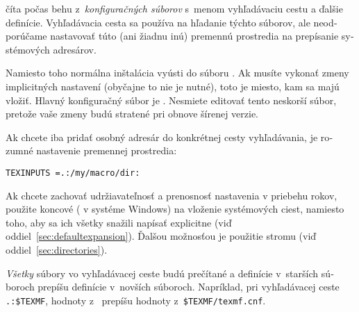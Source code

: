 \documentclass[\classoptions,slovak,english,czech]{\classname}
\begin{document}
\begin{otherlanguage}{slovak}
\KPS{} číta počas behu z~\emph{konfiguračných súborov}
s~menom  vyhľadávaciu cestu a ďalšie definície.
Vyhľadávacia cesta  sa používa na hľadanie týchto súborov, 
ale neodporúčame nastavovať túto (ani žiadnu inú) premennú prostredia 
na prepísanie systémových adresárov.

Namiesto toho normálna inštalácia vyústi do súboru
. Ak musíte vykonať zmeny implicitných 
nastavení (obyčajne to nie je nutné), toto je miesto, kam sa majú vložiť.  
Hlavný konfiguračný súbor je .  
Nesmiete editovať tento neskorší súbor, pretože vaše zmeny budú stratené
pri obnove šírenej verzie.

Ak chcete iba pridať osobný adresár do konkrétnej cesty vyhľadávania, 
je rozumné nastavenie premennej prostredia:
\begin{verbatim}
TEXINPUTS =.:/my/macro/dir:
\end{verbatim}
Ak chcete zachovať udržiavateľnosť a prenosnosť nastavenia v priebehu rokov, 
použite koncové \samp{:} (\samp{;} v systéme Windows) na vloženie systémových ciest,
namiesto toho, aby sa ich všetky snažili napísať explicitne (viď
oddiel~\ref{sec:defaultexpansion}). Ďalšou možnosťou je použitie
stromu  (viď oddiel~\ref{sec:directories}).

\emph{Všetky} súbory
 vo vyhľadávacej ceste budú prečítané a definície
v~starších súboroch prepíšu definície v~novších súboroch.  
Napríklad, pri vyhľadávacej ceste \verb|.:$TEXMF|, 
hodnoty z~ prepíšu hodnoty z~\verb|$TEXMF/texmf.cnf|.


\end{otherlanguage}
\end{document}
